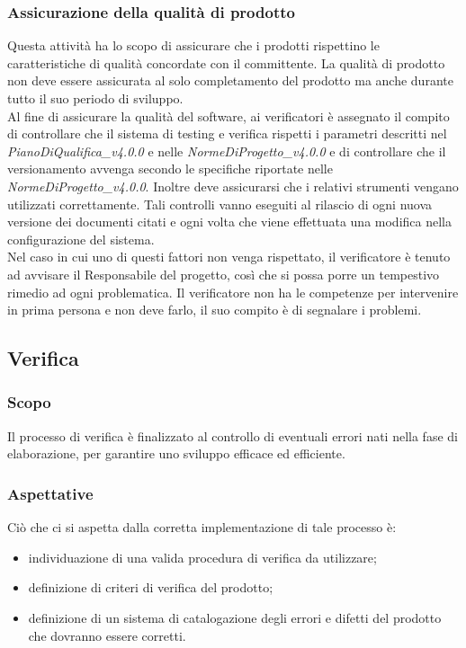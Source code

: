 \documentclass[11pt,a4paper]{article}
\begin{document}
{	\subsubsection{Assicurazione della qualità di prodotto}
	Questa attività ha lo scopo di assicurare che i prodotti rispettino le caratteristiche di qualità concordate con il committente. La qualità di prodotto non deve essere assicurata al solo completamento del prodotto ma anche durante tutto il suo periodo di sviluppo. \\
	Al fine di assicurare la qualità del software, ai verificatori è assegnato il compito di controllare che il sistema di testing e verifica rispetti i parametri descritti nel \textit{PianoDiQualifica\_v4.0.0} e nelle \textit{NormeDiProgetto\_v4.0.0} e di controllare che il versionamento avvenga secondo le specifiche riportate nelle \textit{NormeDiProgetto\_v4.0.0}. Inoltre deve assicurarsi che i relativi strumenti vengano utilizzati correttamente. Tali controlli vanno eseguiti al rilascio di ogni nuova versione dei documenti citati e ogni volta che viene effettuata una modifica nella configurazione del sistema.\\
	Nel caso in cui uno di questi fattori non venga rispettato, il verificatore è tenuto ad avvisare il Responsabile del progetto, così che si possa porre un tempestivo rimedio ad ogni problematica. Il verificatore non ha le competenze per intervenire in prima persona e non deve farlo, il suo compito è di segnalare i problemi.
	\subsection{Verifica}
	
	\subsubsection{Scopo}
	Il processo di verifica è finalizzato al controllo di eventuali errori nati nella fase di elaborazione, per garantire uno sviluppo efficace ed efficiente.
	
	\subsubsection{Aspettative}
	Ciò che ci si aspetta dalla corretta implementazione di tale processo è:
	\begin{itemize}
		\item individuazione di una valida procedura di verifica da utilizzare;
		\item definizione di criteri di verifica del prodotto;
		\item definizione di un sistema di catalogazione degli errori e difetti del prodotto che dovranno essere corretti.
	\end{itemize}	
	
}
\end{document}
